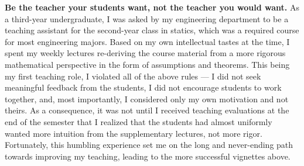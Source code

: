 \textbf{Be the teacher your students want, not the teacher you would want.}
As a third-year undergraduate, I was asked by my engineering department to be a
teaching assistant for the second-year class in statics, which was a required
course for most engineering majors.  Based on my own intellectual tastes at the
time, I spent my weekly lectures re-deriving the course material from a more
rigorous mathematical perspective in the form of assumptions and theorems.  This
being my first teaching role, I violated all of the above rules --- I did not
seek meaningful feedback from the students, I did not encourage students to work
together, and, most importantly, I considered only my own motivation and not
theirs.  As a consequence, it was not until I received teaching evaluations at
the end of the semester that I realized that the students had almost uniformly
wanted more intuition from the supplementary lectures, not more rigor.
Fortunately, this humbling experience set me on the long  and never-ending path
towards improving my teaching, leading to the more successful vignettes above.



